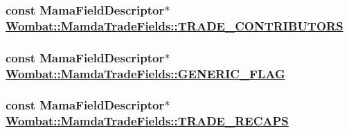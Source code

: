 \hypertarget{classWombat_1_1MamdaTradeFields_70b70fd3681eac1e7e6e3092720b8af7}{
\subsubsection[TRADE\_\-CONTRIBUTORS]{\setlength{\rightskip}{0pt plus 5cm}const Mama\-Field\-Descriptor$\ast$ \hyperlink{classWombat_1_1MamdaTradeFields_70b70fd3681eac1e7e6e3092720b8af7}{Wombat::Mamda\-Trade\-Fields::TRADE\_\-CONTRIBUTORS}}}
\label{classWombat_1_1MamdaTradeFields_70b70fd3681eac1e7e6e3092720b8af7}


\hypertarget{classWombat_1_1MamdaTradeFields_3428193f62baa321da4b8fabc6c2f854}{
\subsubsection[GENERIC\_\-FLAG]{\setlength{\rightskip}{0pt plus 5cm}const Mama\-Field\-Descriptor$\ast$ \hyperlink{classWombat_1_1MamdaTradeFields_3428193f62baa321da4b8fabc6c2f854}{Wombat::Mamda\-Trade\-Fields::GENERIC\_\-FLAG}}}
\label{classWombat_1_1MamdaTradeFields_3428193f62baa321da4b8fabc6c2f854}


\hypertarget{classWombat_1_1MamdaTradeFields_ea1f3f9534bf2d3f55a1be4e425a4a3d}{
\subsubsection[TRADE\_\-RECAPS]{\setlength{\rightskip}{0pt plus 5cm}const Mama\-Field\-Descriptor$\ast$ \hyperlink{classWombat_1_1MamdaTradeFields_ea1f3f9534bf2d3f55a1be4e425a4a3d}{Wombat::Mamda\-Trade\-Fields::TRADE\_\-RECAPS}}}
\label{classWombat_1_1MamdaTradeFields_ea1f3f9534bf2d3f55a1be4e425a4a3d}


